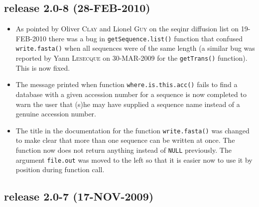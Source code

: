 \documentclass{article}
\begin{document}
\subsection*{release 2.0-8 (28-FEB-2010)}

\begin{itemize}

\item As pointed by Oliver \textsc{Clay} and Lionel \textsc{Guy} on the seqinr diffusion
list on 19-FEB-2010 there was a bug in \texttt{getSequence.list()}
function that confused \texttt{write.fasta()} when all sequences were
of the same length (a similar bug was reported by Yann \textsc{Lesecque}
on 30-MAR-2009 for the \texttt{getTrans()} function). This is now
fixed.

\item The message printed when function \texttt{where.is.this.acc()} fails
to find a database with a given accession number for a sequence is now
completed to warn the user that (s)he may have supplied a sequence name
instead of a genuine accession number.

\item The title in the documentation for the function \texttt{write.fasta()}
was changed to make clear that more than one sequence can be written at once.
The function now does not return anything instead of \texttt{NULL} previously.
The argument \texttt{file.out} was moved to the left so that it is easier now
to use it by position during function call.

\end{itemize}

\subsection*{release 2.0-7 (17-NOV-2009)}
\end{document}
